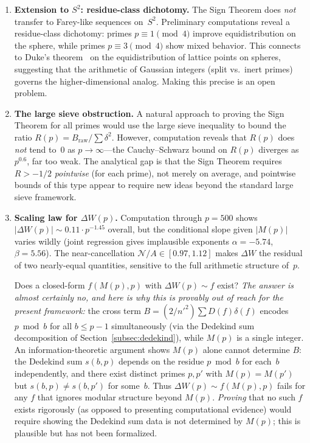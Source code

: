 \documentclass[11pt]{article}
\theoremstyle{definition}
\begin{document}
\begin{enumerate}
  \item \textbf{Extension to $S^2$: residue-class dichotomy.}
    The Sign Theorem does \emph{not} transfer to Farey-like
    sequences on~$S^2$.  Preliminary computations reveal a
    residue-class dichotomy: primes $p \equiv 1 \pmod{4}$
    improve equidistribution on the sphere, while primes
    $p \equiv 3 \pmod{4}$ show mixed behavior.  This connects
    to Duke's theorem~\cite{Duke1988} on the equidistribution
    of lattice points on spheres, suggesting that the arithmetic
    of Gaussian integers (split vs.\ inert primes) governs the
    higher-dimensional analog.  Making this precise is an open
    problem.

  \item \textbf{The large sieve obstruction.}
    A natural approach to proving the Sign Theorem for all
    primes would use the large sieve inequality to bound the
    ratio $R(p) = B_{\mathrm{raw}} / \sum \delta^2$.  However,
    computation reveals that $R(p)$ does \emph{not} tend to~$0$
    as $p \to \infty$---the Cauchy--Schwarz bound on $R(p)$
    diverges as $p^{0.6}$, far too weak.  The analytical gap is
    that the Sign Theorem requires $R > -1/2$ \emph{pointwise}
    (for each prime), not merely on average, and pointwise
    bounds of this type appear to require new ideas beyond the
    standard large sieve framework.

  \item \textbf{Scaling law for $\Delta W(p)$.}
    Computation through $p = 500$ shows $|\Delta W(p)| \sim 0.11 \cdot p^{-1.45}$
    overall, but the conditional slope given $|M(p)|$ varies wildly
    (joint regression gives implausible exponents $\alpha = -5.74$,
    $\beta = 5.56$).  The near-cancellation $\mathcal{N}/A \in [0.97, 1.12]$
    makes $\Delta W$ the residual of two nearly-equal quantities,
    sensitive to the full arithmetic structure of~$p$.

    Does a closed-form $f(M(p),p)$ with $\Delta W(p) \sim f$ exist?
    \emph{The answer is almost certainly no, and here is why this
    is provably out of reach for the present framework:}
    the cross term $B = (2/{n'}^2)\sum D(f)\delta(f)$ encodes
    $p \bmod b$ for all $b \le p-1$ simultaneously (via the Dedekind
    sum decomposition of Section~\ref{subsec:dedekind}), while $M(p)$
    is a single integer.  An information-theoretic argument shows
    $M(p)$ alone cannot determine $B$: the Dedekind sum $s(b,p)$
    depends on the residue $p \bmod b$ for each~$b$ independently,
    and there exist distinct primes $p, p'$ with $M(p) = M(p')$
    but $s(b,p) \ne s(b,p')$ for some~$b$.
    Thus $\Delta W(p) \sim f(M(p), p)$ fails for any $f$ that ignores
    modular structure beyond $M(p)$.
    \emph{Proving} that no such $f$ exists rigorously (as opposed
    to presenting computational evidence) would require showing
    the Dedekind sum data is not determined by $M(p)$; this is
    plausible but has not been formalized.


\end{enumerate}
\end{document}
